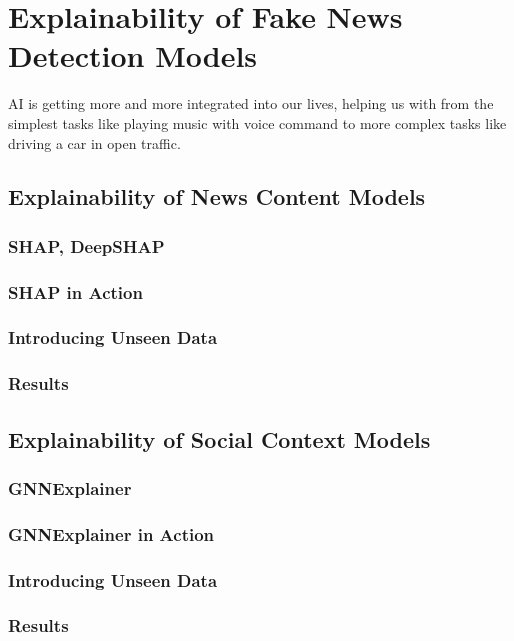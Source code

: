 

\chapter{Explainability of Fake News Detection Models}\label{chapter:explainability_of_fnd_models}
AI is getting more and more integrated into our lives, helping us with from the simplest tasks like playing music with voice command to more complex tasks like driving a car in open traffic.
\section{Explainability of News Content Models}
\label{sec:explainabilityOfNewsContentModels}
\subsection{SHAP, DeepSHAP}

\subsection{SHAP in Action}

\subsection{Introducing Unseen Data}

\subsection{Results}

\section{Explainability of Social Context Models}

\subsection{GNNExplainer}

\subsection{GNNExplainer in Action}

\subsection{Introducing Unseen Data}

\subsection{Results}
